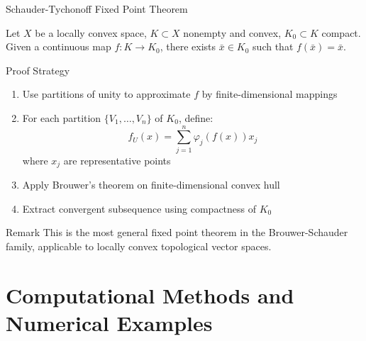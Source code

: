 \documentclass[aspectratio=169,10pt]{beamer}
\begin{document}
\begin{frame}[allowframebreaks]{Schauder-Tychonoff Fixed Point Theorem}
    \begin{theorem}
        Let $X$ be a locally convex space, $K \subset X$ nonempty and convex, $K_0 \subset K$ compact. Given a continuous map $f: K \to K_0$, there exists $\bar{x} \in K_0$ such that $f(\bar{x}) = \bar{x}$.
    \end{theorem}

    \begin{block}{Proof Strategy}
        \begin{enumerate}
            \item Use partitions of unity to approximate $f$ by finite-dimensional mappings
            \item For each partition $\{V_1, \ldots, V_n\}$ of $K_0$, define:
                \[f_U(x) = \sum_{j=1}^n \varphi_j(f(x)) x_j\]
                where $x_j$ are representative points
            \item Apply Brouwer's theorem on finite-dimensional convex hull
            \item Extract convergent subsequence using compactness of $K_0$
        \end{enumerate}
    \end{block}

    \begin{block}{Remark}
        This is the most general fixed point theorem in the Brouwer-Schauder family, applicable to locally convex topological vector spaces.
    \end{block}
\end{frame}

\section{Computational Methods and Numerical Examples}
\end{document}
